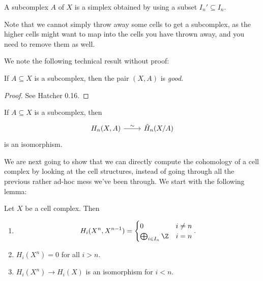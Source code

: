 \documentclass[a4paper]{article}
\theoremstyle{definition}
\begin{document}
\begin{defi}[Subcomplex]
  A subcomplex $A$ of $X$ is a simplex obtained by using a subset $I_n' \subseteq I_n$.
\end{defi}
Note that we cannot simply throw away some cells to get a subcomplex, as the higher cells might want to map into the cells you have thrown away, and you need to remove them as well.

We note the following technical result without proof:
\begin{lemma}
  If $A \subseteq X$ is a subcomplex, then the pair $(X, A)$ is \emph{good}.
\end{lemma}

\begin{proof}
  See Hatcher 0.16.
\end{proof}

\begin{cor}
  If $A \subseteq X$ is a subcomplex, then
  \[
    \begin{tikzcd}
      H_n(X, A) \ar[r, "\sim"] & \tilde{H}_n(X/A)
    \end{tikzcd}
  \]
  is an isomorphism.
\end{cor}

We are next going to show that we can directly compute the cohomology of a cell complex by looking at the cell structures, instead of going through all the previous rather ad-hoc mess we've been through. We start with the following lemma:
\begin{lemma}
  Let $X$ be a cell complex. Then
  \begin{enumerate}
    \item
      \[
        H_i(X^n, X^{n - 1}) =
        \begin{cases}
          0 & i \not= n\\
          \bigoplus_{i \in I_n} \Z & i = n
        \end{cases}.
      \]
    \item $H_i(X^n) = 0$ for all $i > n$.
    \item $H_i(X^n) \to H_i(X)$ is an isomorphism for $i < n$.
  \end{enumerate}
\end{lemma}
\end{document}
